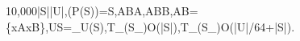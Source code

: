10{,}000|S|\geq\delta|U|,\qquad {}(P(S))=S,\qquad A\cap B\subseteq A,\qquad A\cap B\subseteq B,\qquad A\setminus B=\{x\in A\mid x\notin B\},\qquad U\setminus S=_U(S),\qquad T_{}(S_{})\in O(|S|),\qquad T_{}(S_{})\in O(|U|/64+|S|).
